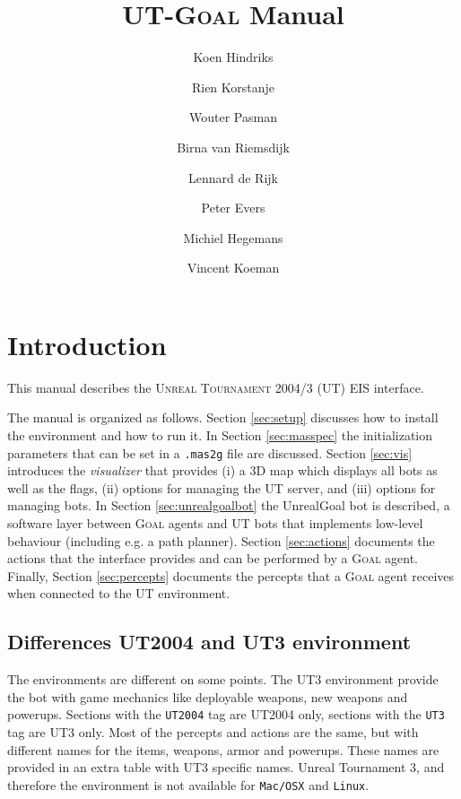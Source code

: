\documentclass[11pt,a4paper]{article}
\newcommand{\Goal}{\textsc{Goal}}
\begin{document}
%
\title{UT-{\Goal} Manual}

%
\author{Koen Hindriks}
\author{Rien Korstanje}
\author{Wouter Pasman}
\author{Birna van Riemsdijk}
\author{Lennard de Rijk}
\author{Peter Evers}
\author{Michiel Hegemans}
\author{Vincent Koeman}

%
\maketitle

\newpage

%
%
%
\section{Introduction}
%

This manual describes the \textsc{Unreal Tournament 2004/3} (UT) EIS interface.

The manual is organized as follows. Section \ref{sec:setup} discusses how to install the environment and how to run it. In Section \ref{sec:masspec} the initialization parameters that can be set in a \texttt{.mas2g} file are discussed. Section \ref{sec:vis} introduces the \emph{visualizer} that provides (i) a 3D map which displays all bots as well as the flags, (ii) options for managing the UT server, and (iii) options for managing bots. In Section \ref{sec:unrealgoalbot} the UnrealGoal bot is described, a software layer between {\Goal} agents and UT bots that implements low-level behaviour (including e.g. a path planner). Section \ref{sec:actions} documents the actions that the interface provides and can be performed by a {\Goal} agent. Finally, Section \ref{sec:percepts} documents the percepts that a {\Goal} agent receives when connected to the UT environment.

\subsection{Differences UT2004 and UT3 environment}

The environments are different on some points. The UT3 environment provide the bot with game mechanics like deployable weapons, new weapons and powerups. Sections with the \texttt{UT2004} tag are UT2004 only, sections with the \texttt{UT3} tag are UT3 only. Most of the percepts and actions are the same, but with different names for the items, weapons, armor and powerups. These names are provided in an extra table with UT3 specific names. Unreal Tournament 3, and therefore the environment is not available for \texttt{Mac/OSX} and \texttt{Linux}. 
\end{document}
